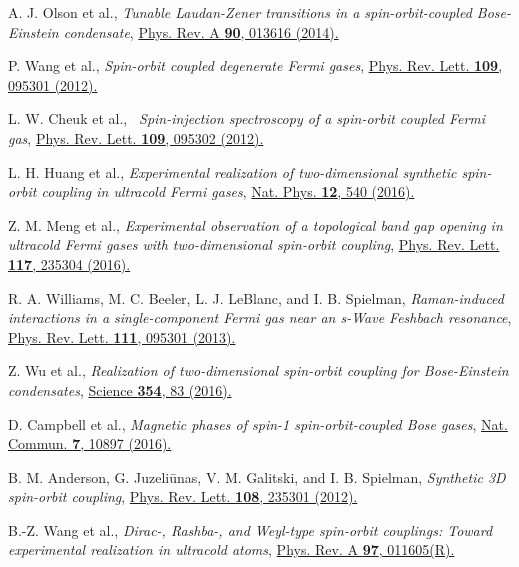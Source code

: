 \documentclass[aps,prl,floatfix,twocolumn,reprint]{revtex4}
\begin{document}
\begin{thebibliography}{99}
 A. J. Olson et al., \textit{Tunable Laudan-Zener
transitions in a spin-orbit-coupled Bose-Einstein condensate}, \href{https://doi.org/10.1103/PhysRevA.90.013616}%
{Phys. Rev. A \textbf{90}, 013616 (2014).}

 P. Wang et al., \textit{Spin-orbit coupled degenerate Fermi
gases}, \href{https://doi.org/10.1103/PhysRevLett.109.095301}{Phys. Rev.
Lett. \textbf{109}, 095301 (2012).}

 L. W. Cheuk et al., \textit{\ Spin-injection spectroscopy
of a spin-orbit coupled Fermi gas}, \href{https://doi.org/10.1103/PhysRevLett.109.095302}%
{Phys. Rev. Lett. \textbf{109}, 095302 (2012).}

 L. H. Huang et al., \textit{Experimental realization of
two-dimensional synthetic spin-orbit coupling in ultracold Fermi gases},
\href{https://doi.org/10.1038/nphys3672}{Nat. Phys. \textbf{12}, 540 (2016).}

 Z. M. Meng et al., \textit{Experimental observation of a
topological band gap opening in ultracold Fermi gases with two-dimensional
spin-orbit coupling}, \href{https://doi.org/10.1103/PhysRevLett.117.235304}{%
Phys. Rev. Lett. \textbf{117}, 235304 (2016).}

 R. A. Williams, M. C. Beeler, L. J. LeBlanc, and I. B.
Spielman, \textit{Raman-induced interactions in a single-component Fermi gas
near an s-Wave Feshbach resonance}, \href{https://doi.org/10.1103/PhysRevLett.111.095301}%
{Phys. Rev. Lett. \textbf{111}, 095301 (2013).}

 Z. Wu et al., \textit{Realization of two-dimensional
spin-orbit coupling for Bose-Einstein condensates}, \href{https://doi.org/10.1126/science.aaf6689}%
{Science \textbf{354}, 83 (2016).}

 D. Campbell et al., \textit{Magnetic phases of spin-1
spin-orbit-coupled Bose gases}, \href{https://doi.org/10.1038/ncomms10897}{%
Nat. Commun. \textbf{7}, 10897 (2016).}

 B. M. Anderson, G. Juzeli{\=u}nas, V. M. Galitski, and I.
B. Spielman, \textit{Synthetic 3D spin-orbit coupling}, \href{https://doi.org/10.1103/PhysRevLett.108.235301}%
{Phys. Rev. Lett. \textbf{108}, 235301 (2012).}

 B.-Z. Wang et al., \textit{Dirac-, Rashba-, and Weyl-type
spin-orbit couplings: Toward experimental realization in ultracold atoms},
\href{https://doi.org/10.1103/PhysRevA.97.011605}{Phys. Rev. A \textbf{97},
011605(R).}


\end{thebibliography}
\end{document}
